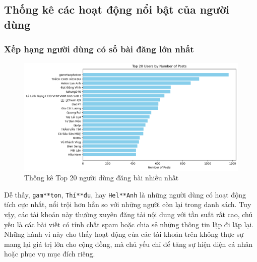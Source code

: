 \newpage
\subsection{Thống kê các hoạt động nổi bật của người dùng}
\subsubsection{Xếp hạng người dùng có số bài đăng lớn nhất}

\begin{figure}[H]
    \centering
    \includegraphics[width = 0.85\linewidth]{images/C2_pic27.png}
    \vspace{-1em}
    \caption{Thống kê Top 20 người dùng đăng bài nhiều nhất}
    \label{fig:2.18}
\end{figure}

Dễ thấy, \texttt{gam**ton}, \texttt{Thí**đu}, hay \texttt{Hel**Anh} là những người dùng có hoạt động tích cực nhất, nổi trội hơn hẳn so với những người còn lại trong danh sách. Tuy vậy, các tài khoản này thường xuyên đăng tải nội dung với tần suất rất cao, chủ yếu là các bài viết có tính chất spam hoặc chia sẻ những thông tin lặp đi lặp lại. Những hành vi này cho thấy hoạt động của các tài khoản trên không thực sự mang lại giá trị lớn cho cộng đồng, mà chủ yếu chỉ để tăng sự hiện diện cá nhân hoặc phục vụ mục đích riêng.

